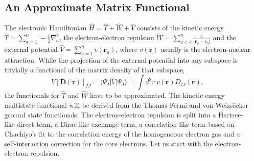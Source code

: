 \documentclass[journal=jpclcd,manuscript=letter]{achemso}
\newcommand\m[1]{\mathbf{#1}}
\renewcommand\vec[1]{\mathbf{#1}}
\begin{document}
\subsection{An Approximate Matrix Functional}
\label{sec:approximate_lda_msdft}
The electronic Hamiltonian $\hat{H} = \hat{T} + \hat{W} + \hat{V}$ consists of
the kinetic energy $\hat{T} = \sum_{a=1}^{n} -\frac{1}{2} \nabla^2_a$,
the electron-electron repulsion $\hat{W} = \sum_{a < b}^{n} \frac{1}{\vert \hat{\vec{r}}_a - \hat{\vec{r}}_b \vert}$
and the external potential $\hat{V} = \sum_{a=1}^{n} v(\vec{r}_a)$, where $v(\vec{r})$ usually is the electron-nuclear attraction.
While the projection of the external potential into any subspace is trivially a functional of the matrix density of that subspace,
\begin{equation}
 V[\m{D}(\vec{r})]_{IJ} = \langle \Psi_I \vert \hat{V} \vert \Psi_J \rangle = \int d^3r ~ v(\vec{r}) D_{IJ}(\vec{r}),
\end{equation}
the functionals for $\hat{T}$ and $\hat{W}$ have to be approximated. The kinetic energy multistate functional
will be derived from the Thomas-Fermi and von-Weizs\"{a}cker ground state functionals. The electron-electron repulsion
is split into a Hartree-like direct term, a Dirac-like exchange term, a correlation-like term based on Chachiyo's fit to
the correlation energy of the homogeneous electron gas and a self-interaction correction for the core electrons. Let us start
with the electron-electron repulsion.
\end{document}
